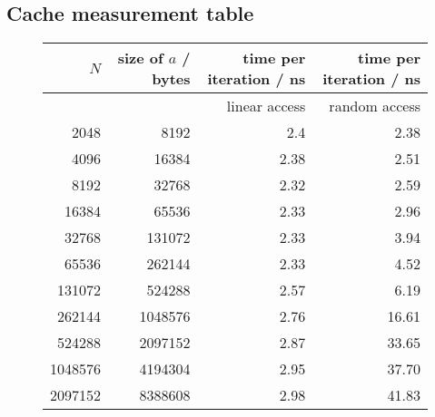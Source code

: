\documentclass[10pt,a4paper]{article}
\begin{document}
    \subsection{Cache measurement table}
    \begin{figure}[h!]
        \begin{center}
            \begin{tabular}{|r|r|r|r|}
                \hline
                $N$ & size of $a$ / bytes& time per iteration / ns & time per iteration / ns \\ \hline
                & & linear access & random access \\ \hline
                \num[group-separator={,}]{    2048    }    &    \num[group-separator={,}]{    8192    }    & 2.4 & 2.38    \\ \hline
                \num[group-separator={,}]{    4096    }    &    \num[group-separator={,}]{    16384    }    & 2.38 & 2.51    \\ \hline
                \num[group-separator={,}]{    8192    }    &    \num[group-separator={,}]{    32768    }    & 2.32 & 2.59    \\ \hline
                \num[group-separator={,}]{    16384    }    &    \num[group-separator={,}]{    65536    }    & 2.33 & 2.96    \\ \hline
                \num[group-separator={,}]{    32768    }    &    \num[group-separator={,}]{    131072    }    & 2.33 & 3.94    \\ \hline
                \num[group-separator={,}]{    65536    }    &    \num[group-separator={,}]{    262144    }    & 2.33 & 4.52    \\ \hline
                \num[group-separator={,}]{    131072    }    &    \num[group-separator={,}]{    524288    }    & 2.57 & 6.19    \\ \hline
                \num[group-separator={,}]{    262144    }    &    \num[group-separator={,}]{    1048576    }    & 2.76 & 16.61    \\ \hline
                \num[group-separator={,}]{    524288    }    &    \num[group-separator={,}]{    2097152    }    & 2.87 & 33.65    \\ \hline
                \num[group-separator={,}]{    1048576    }    &    \num[group-separator={,}]{    4194304    }    & 2.95 & 37.70    \\ \hline
                \num[group-separator={,}]{    2097152    }    &    \num[group-separator={,}]{    8388608    }    & 2.98 & 41.83    \\ \hline

\end{tabular}
\end{center}
\end{figure}
\end{document}
